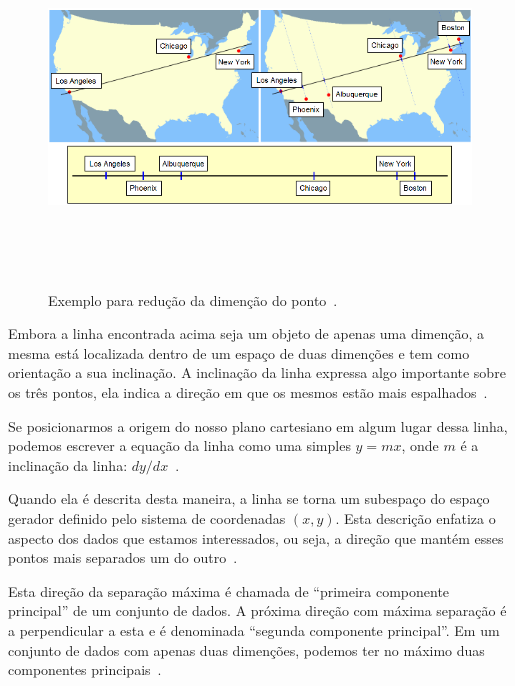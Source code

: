 	\begin{figure}[hbt]
		\begin{center}
			\includegraphics[height=9.5cm,width=12.5cm]{figuras/2.FundamentacaoTeorica/PCAexemploMapa.png}
		\end{center}
		\caption{Exemplo para redução da dimenção do ponto~\cite{hewitt}.}
		\label{exemploPCA}
	\end{figure}

Embora a linha encontrada acima seja um objeto de apenas uma dimenção, a mesma está localizada dentro de um espaço de duas dimenções e tem como orientação a sua inclinação. A inclinação da linha expressa algo importante sobre os três pontos, ela indica a direção em que os mesmos estão mais espalhados~\cite{hewitt}.

Se posicionarmos a origem do nosso plano cartesiano em algum lugar dessa linha, podemos escrever a equação da linha como uma simples $y = mx$, onde $\displaystyle m$ é a inclinação da linha: $dy / dx$~\cite{hewitt}.

Quando ela é descrita desta maneira, a linha se torna um subespaço do espaço gerador definido pelo sistema de coordenadas $\displaystyle (x,y)$. Esta descrição enfatiza o aspecto dos dados que estamos interessados, ou seja, a direção que mantém esses pontos mais separados um do outro~\cite{hewitt}.

Esta direção da separação máxima é chamada de ``primeira componente principal'' de um conjunto de dados. A próxima direção com máxima separação é a perpendicular a esta e é denominada ``segunda componente principal''. Em um conjunto de dados com apenas duas dimenções, podemos ter no máximo duas componentes principais~\cite{hewitt}.


